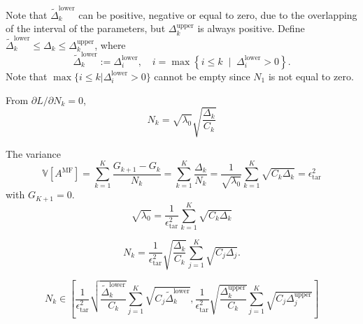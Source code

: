Note that $\widetilde{\Delta}_k^{\text{lower}}$ can be positive, negative or equal to zero, due to the overlapping of the interval of the parameters, but $\Delta_k^{\text{upper}}$ is always positive. Define $\widetilde{\Delta}_k^{\text{lower}}\le \Delta_k \le \Delta_k^{\text{upper}}$, where
\[
\widetilde{\Delta}_k^{\text{lower}}:=\Delta_i^{\text{lower}}, \quad i=\max\left\{i\le k\;\;\vert\;\; \Delta_i^{\text{lower}}>0\right\}.
\]
Note that $\max\{i\le k\vert \Delta_i^{\text{lower}}>0\}$ cannot be empty since $N_1$ is not equal to zero.

From $\partial L/\partial N_k=0$, 
\[
N_k = \sqrt{\lambda_0}\sqrt{\frac{\Delta_k}{C_k}}
\]

The variance 
\[
\mathbb{V}\left[A^{\text{MF}}\right] = \sum_{k=1}^K\frac{G_{k+1} - G_k}{N_k} = \sum_{k=1}^K\frac{\Delta_k}{N_k} =\frac{1}{\sqrt{\lambda_0}}\sum_{k=1}^K \sqrt{C_k\Delta_k}= \epsilon_{\text{tar}}^2
\]
with $G_{K+1} = 0$.
\[
\sqrt{\lambda_0} = \frac{1}{\epsilon_{\text{tar}}^2}\sum_{k=1}^K \sqrt{C_k\Delta_k}
\]

\[
N_k = \frac{1}{\epsilon_{\text{tar}}^2}\sqrt{\frac{\Delta_k}{C_k}}\sum_{j=1}^K \sqrt{C_j\Delta_j}.
\]

\[
N_k \in \left[\frac{1}{\epsilon_{\text{tar}}^2}\sqrt{\frac{\widetilde{\Delta}_k^{\text{lower}}}{C_k}}\sum_{j=1}^K \sqrt{C_j\widetilde{\Delta}_k^{\text{lower}}},\frac{1}{\epsilon_{\text{tar}}^2}\sqrt{\frac{\Delta_k^{\text{upper}}}{C_k}}\sum_{j=1}^K \sqrt{C_j\Delta_j^{\text{upper}}}\right]
\]




